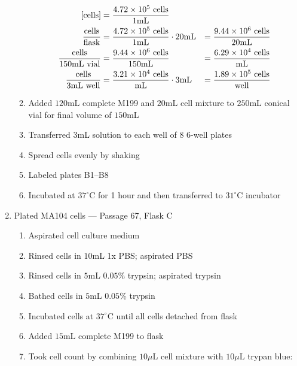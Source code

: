 \begin{enumerate}
\begin{enumerate}
				\begin{align*}
				\text{[cells]} &= \frac{4.72\times 10^{5}\text{ cells}}{1\text{mL}} \\
				\frac{\text{cells}}{\text{flask}} &= \frac{4.72\times 10^{5}\text{ cells}}{1\text{mL}} \cdot 20\text{mL} &= \frac{9.44\times 10^{6}\text{ cells}}{20\text{mL}}\\
				\frac{\text{cells}}{150\text{mL vial}} &= \frac{9.44\times 10^{6}\text{ cells}}{150\text{mL}} &= \frac{6.29\times 10^{4}\text{ cells}}{\text{mL}}\\
				\frac{\text{cells}}{3\text{mL well}} &= \frac{3.21\times 10^{4}\text{ cells}}{\text{mL}} \cdot 3\text{mL} &= \frac{1.89\times 10^{5}\text{ cells}}{\text{well}}\\
				\end{align*}
			\item Added $120$mL complete M199 and $20$mL cell mixture to $250$mL conical vial for final volume of $150$mL
			\item Transferred $3$mL solution to each well of 8 6-well plates
			\item Spread cells evenly by shaking
			\item Labeled plates B1--B8
			\item Incubated at $37^{\circ}$C for 1 hour and then transferred to $31^{\circ}$C incubator
		\end{enumerate}
	\item Plated MA104 cells --- Passage 67, Flask C
		\begin{enumerate}
			\item Aspirated cell culture medium
			\item Rinsed cells in $10$mL 1x PBS; aspirated PBS
			\item Rinsed cells in $5$mL $0.05$\% trypsin; aspirated trypsin
			\item Bathed cells in $5$mL $0.05$\% trypsin
			\item Incubated cells at $37^{\circ}$C until all cells detached from flask
			\item Added $15$mL complete M199 to flask
			\item Took cell count by combining $10\mu$L cell mixture with $10\mu$L trypan blue:
			

\end{enumerate}
\end{enumerate}
